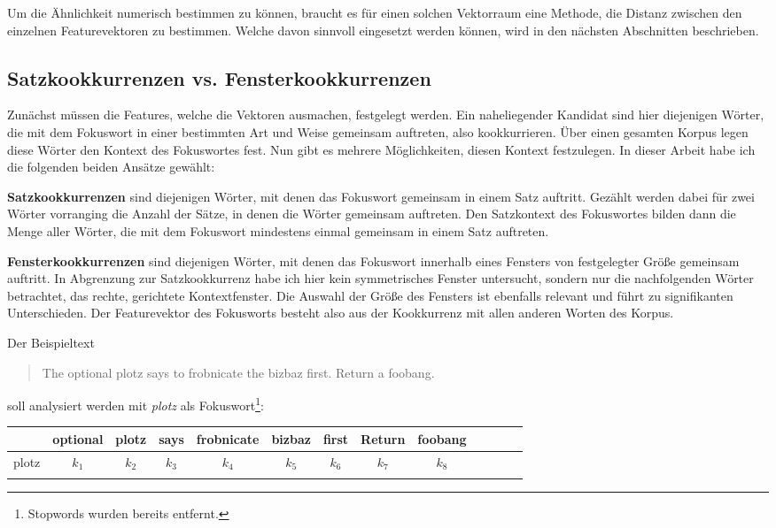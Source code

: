 \documentclass[11pt,numbers=noenddot]{scrartcl}
\begin{document}
Um die Ähnlichkeit numerisch bestimmen zu können, braucht es für einen solchen Vektorraum eine Methode, die Distanz zwischen den einzelnen Featurevektoren zu bestimmen. Welche davon sinnvoll eingesetzt werden können, wird in den nächsten Abschnitten beschrieben.

\subsection{Satzkookkurrenzen vs. Fensterkookkurrenzen}

Zunächst müssen die Features, welche die Vektoren ausmachen, festgelegt werden. Ein naheliegender Kandidat sind hier diejenigen Wörter, die mit dem Fokuswort in einer bestimmten Art und Weise gemeinsam auftreten, also kookkurrieren. Über einen gesamten Korpus legen diese Wörter den Kontext des Fokuswortes fest. Nun gibt es mehrere Möglichkeiten, diesen Kontext festzulegen. In dieser Arbeit habe ich die folgenden beiden Ansätze gewählt:

\textbf{Satzkookkurrenzen} sind diejenigen Wörter, mit denen das Fokuswort gemeinsam in einem Satz auftritt. Gezählt werden dabei für zwei Wörter vorranging die Anzahl der Sätze, in denen die Wörter gemeinsam auftreten. Den Satzkontext des Fokuswortes bilden dann die Menge aller Wörter, die mit dem Fokuswort mindestens einmal gemeinsam in einem Satz auftreten.

\textbf{Fensterkookkurrenzen} sind diejenigen Wörter, mit denen das Fokuswort innerhalb eines Fensters von festgelegter Größe gemeinsam auftritt. In Abgrenzung zur Satzkookkurrenz habe ich hier kein symmetrisches Fenster untersucht, sondern nur die nachfolgenden Wörter betrachtet, das rechte, gerichtete Kontextfenster. Die Auswahl der Größe des Fensters ist ebenfalls relevant und führt zu signifikanten Unterschieden. Der Featurevektor des Fokusworts besteht also aus der Kookkurrenz mit allen anderen Worten des Korpus.

\noindent Der Beispieltext
\begin{quote}
    The optional plotz says to frobnicate the bizbaz first. Return a foobang.
\end{quote}
soll analysiert werden mit \emph{plotz} als Fokuswort\footnote{Stopwords wurden bereits entfernt.}:

\begin{table}[h]
    \begin{center}
        \begin{tabular}{ l | *{12}{c}}
                 & optional & plotz & says & frobnicate & bizbaz & first & Return & foobang \\ \hline
            plotz & $k_{1}$ & $k_{2}$ & $k_{3}$ & $k_{4}$ & $k_{5}$ & $k_{6}$ & $k_{7}$ & $k_{8}$ \\ \\
        \end{tabular}
    \end{center}
\end{table}
\end{document}
